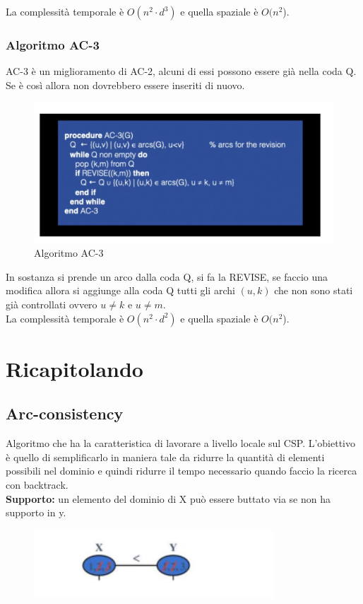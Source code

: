 La complessità temporale è $O(n^2 \cdot d^3)$ e quella spaziale è $O(n^2$).

\subsubsection{Algoritmo AC-3}
AC-3 è un miglioramento di AC-2, alcuni di essi possono essere già nella
coda Q. Se è così allora non dovrebbero essere inseriti di nuovo.

\begin{figure}[H]
    \centering
    \includegraphics[width=13cm, keepaspectratio]{img/Cap3/ac-3.png}
    \caption{Algoritmo AC-3}
\end{figure}

In sostanza si prende un arco dalla coda Q, si fa la REVISE, se faccio una
modifica allora si aggiunge alla coda Q tutti gli archi $(u,k)$ che non sono stati
già controllati ovvero $u \neq k$ e $u \neq m$.\\
La complessità temporale è $O(n^2 \cdot d^2)$ e quella spaziale è $O(n^2$).

\section{Ricapitolando}

\subsection{Arc-consistency}

Algoritmo che ha la caratteristica di lavorare a livello locale sul CSP.
L'obiettivo è quello di semplificarlo in maniera tale da ridurre la quantità di
elementi possibili nel dominio e quindi ridurre il tempo necessario quando
faccio la ricerca con backtrack. \\\textbf{Supporto: } un elemento del dominio
di X può essere buttato via se non ha supporto in y.
\begin{figure}[H]
    \centering
    \includegraphics[width=9cm, keepaspectratio]{img/Cap3/riassunto1.png}
\end{figure}

